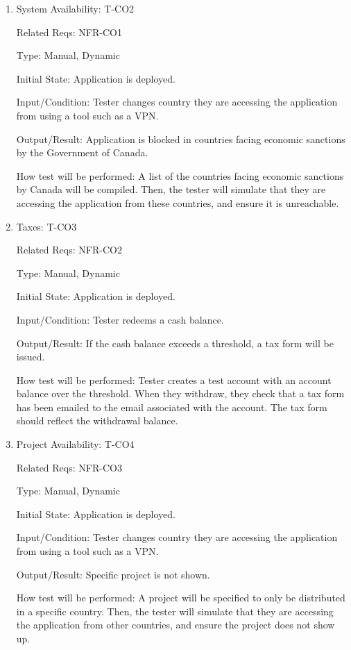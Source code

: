 \documentclass[12pt, titlepage]{article}
\begin{document}
\begin{enumerate}

\item{System Availability: T-CO2\\}

Related Reqs: NFR-CO1

Type: Manual, Dynamic
					
Initial State: Application is deployed.
					
Input/Condition: Tester changes country they are accessing the application from using a tool such as a VPN.
					
Output/Result: Application is blocked in countries facing economic sanctions by the Government of Canada.
					
How test will be performed: A list of the countries facing economic sanctions by Canada will be compiled. Then, the tester will simulate that they are accessing the application from these countries, and ensure it is unreachable.

\item{Taxes: T-CO3\\}

Related Reqs: NFR-CO2

Type: Manual, Dynamic
					
Initial State: Application is deployed.
					
Input/Condition: Tester redeems a cash balance.
					
Output/Result: If the cash balance exceeds a threshold, a tax form will be issued.
					
How test will be performed: Tester creates a test account with an account balance over the threshold. When they withdraw, they check that a tax form has been emailed to the email associated with the account. The tax form should reflect the withdrawal balance.

\item{Project Availability: T-CO4\\}

Related Reqs: NFR-CO3

Type: Manual, Dynamic
					
Initial State: Application is deployed.
					
Input/Condition: Tester changes country they are accessing the application from using a tool such as a VPN.
					
Output/Result: Specific project is not shown.
					
How test will be performed: A project will be specified to only be distributed in a specific country. Then, the tester will simulate that they are accessing the application from other countries, and ensure the project does not show up.

\end{enumerate}
\end{document}
